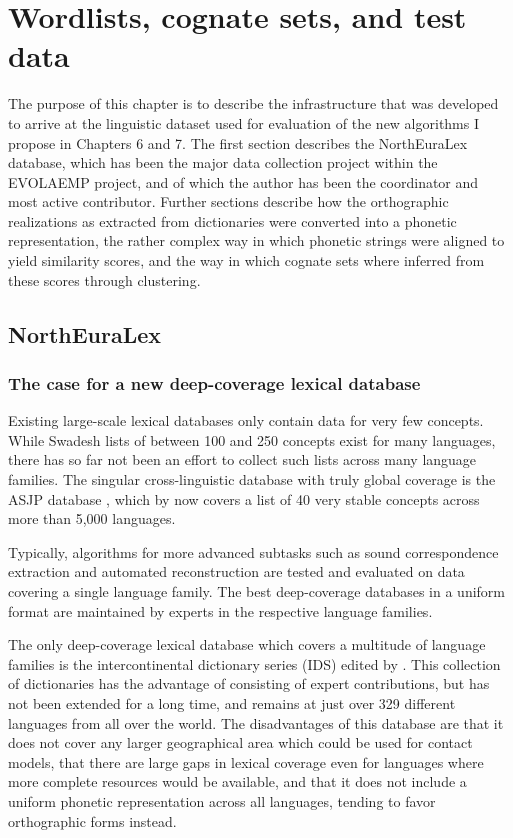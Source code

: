 \chapter{Wordlists, cognate sets, and test data}\label{sec:4}

The purpose of this chapter is to describe the infrastructure that was developed to arrive at the linguistic dataset used for evaluation of the new algorithms I propose in Chapters 6 and 7. The first section describes the NorthEuraLex database, which has been the major data collection project within the EVOLAEMP project, and of which the author has been the coordinator and most active contributor. Further sections describe how the orthographic realizations as extracted from dictionaries were converted into a phonetic representation, the rather complex way in which phonetic strings were aligned to yield similarity scores, and the way in which cognate sets where inferred from these scores through clustering.

\section{NorthEuraLex}\label{sec:4.1}

\subsection{The case for a new deep-coverage lexical database}
Existing large-scale lexical databases only contain data for very few concepts. While Swadesh lists of between 100 and 250 concepts exist for many languages, there has so far not been an effort to collect such lists across many language families. The singular cross-linguistic database with truly global coverage is the ASJP database \citep{asjp17}, which by now covers a list of 40 very stable concepts across more than 5,000 languages.

Typically, algorithms for more advanced subtasks such as sound correspondence extraction and automated reconstruction are tested and evaluated on data covering a single language family. The best deep-coverage databases in a uniform format are maintained by experts in the respective language families.

The only deep-coverage lexical database which covers a multitude of language families is the intercontinental dictionary series (IDS) edited by \cite{ids}. This collection of dictionaries has the advantage of consisting of expert contributions, but has not been extended for a long time, and remains at just over 329 different languages from all over the world. The disadvantages of this database are that it does not cover any larger geographical area which could be used for contact models, that there are large gaps in lexical coverage even for languages where more complete resources would be available, and that it does not include a uniform phonetic representation across all languages, tending to favor orthographic forms instead.

